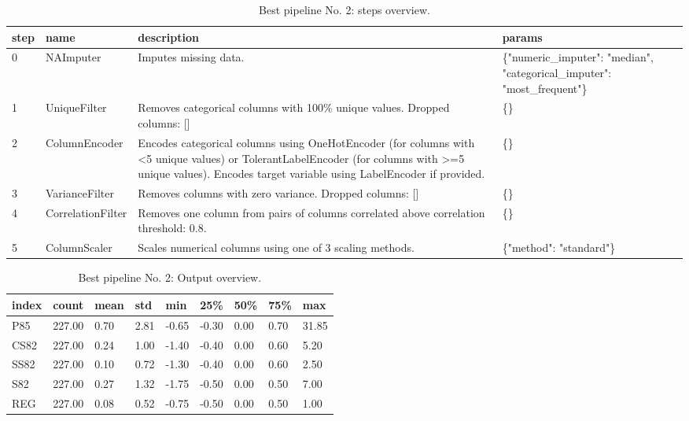 \documentclass{article}%
\begin{document}
%


\begin{table}[H]%
\begin{center}%
\renewcommand{\arraystretch}{1.5}%
\begin{tabular}{p{7mm} p{35mm} p{80mm} p{50mm}}%
\hline%
\textbf{step}&\textbf{name}&\textbf{description}&\textbf{params}\\%
\hline%
0&NAImputer&Imputes missing data.&\{"numeric\_imputer": "median", "categorical\_imputer": "most\_frequent"\}\\%
1&UniqueFilter&Removes categorical columns with 100\% unique values. Dropped columns: {[}{]}&\{\}\\%
2&ColumnEncoder&Encodes categorical columns using OneHotEncoder (for columns with <5 unique values) or TolerantLabelEncoder (for columns with >=5 unique values). Encodes target variable using LabelEncoder if provided.&\{\}\\%
3&VarianceFilter&Removes columns with zero variance. Dropped columns: {[}{]}&\{\}\\%
4&CorrelationFilter&Removes one column from pairs of columns correlated above correlation threshold: 0.8.&\{\}\\%
5&ColumnScaler&Scales numerical columns using one of 3 scaling methods.&\{"method": "standard"\}\\%
\hline%
\end{tabular}%
\end{center}%
\caption{Best pipeline No. 2: steps overview.}%
\end{table}

%


\begin{table}[H]%
\begin{center}%
\renewcommand{\arraystretch}{1.5}%
\begin{tabular}{l l l l l l l l l}%
\hline%
\textbf{index}&\textbf{count}&\textbf{mean}&\textbf{std}&\textbf{min}&\textbf{25\%}&\textbf{50\%}&\textbf{75\%}&\textbf{max}\\%
\hline%
P85&227.00&0.70&2.81&{-}0.65&{-}0.30&0.00&0.70&31.85\\%
CS82&227.00&0.24&1.00&{-}1.40&{-}0.40&0.00&0.60&5.20\\%
SS82&227.00&0.10&0.72&{-}1.30&{-}0.40&0.00&0.60&2.50\\%
S82&227.00&0.27&1.32&{-}1.75&{-}0.50&0.00&0.50&7.00\\%
REG&227.00&0.08&0.52&{-}0.75&{-}0.50&0.00&0.50&1.00\\%
\hline%
\end{tabular}%
\end{center}%
\caption{Best pipeline No. 2: Output overview.}%
\end{table}
\end{document}
